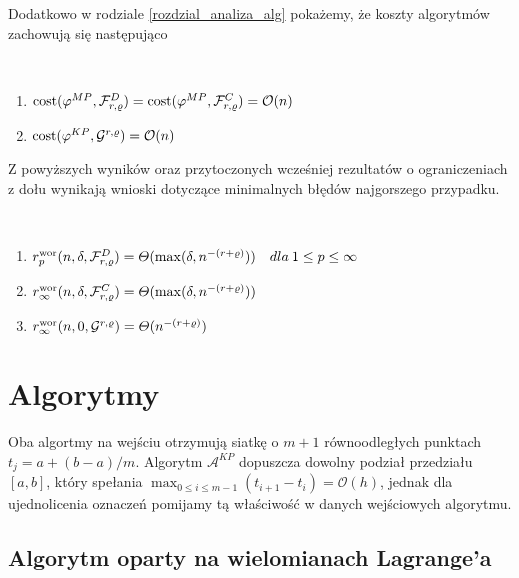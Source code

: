 \documentclass[oik, pdftex, robocza, man]{mgrwms}
\begin{document}
    Dodatkowo w rodziale \ref{rozdzial_analiza_alg} pokażemy, że koszty algorytmów zachowują się następująco

    \begin{stw}~%
        \begin{enumerate}
            \item $\mathrm{cost}(\varphi^{MP}, \mathcal{F}_{r,\varrho}^{D}) = \mathrm{cost}(\varphi^{MP}, \mathcal{F}_{r,\varrho}^{C}) = \mathcal{O}(n)$
            \item $\mathrm{cost}(\varphi^{KP}, \mathcal{G}^{r,\varrho}) = \mathcal{O}(n)$
        \end{enumerate}
    \end{stw}

    Z powyższych wyników oraz przytoczonych wcześniej rezultatów o ograniczeniach z dołu wynikają wnioski dotyczące minimalnych błędów najgorszego przypadku.

    \begin{cor}~
        \begin{enumerate}[label=(\roman*)]
            \item $r^{\mathrm{wor}}_{p}(n, \delta, \mathcal{F}^{D}_{r,\varrho}) = \varTheta(\max(\delta, n^{-(r+\varrho)})) \quad dla \: 1 \leq p \leq \infty$
            \item $r^{\mathrm{wor}}_{\infty}(n, \delta, \mathcal{F}^{C}_{r,\varrho}) = \varTheta(\max(\delta, n^{-(r+\varrho)}))$
            \item $r^{\mathrm{wor}}_{\infty}(n, 0, \mathcal{G}^{r,\varrho}) = \varTheta(n^{-(r+\varrho)})$
        \end{enumerate}
    \end{cor}
    
\mgrclosechapter


\chapter{Algorytmy}

    Oba algortmy na wejściu otrzymują siatkę o $m+1$ równoodległych punktach $t_{j} = a+(b-a) / m$. Algorytm $\mathcal{A}^{KP}$ dopuszcza dowolny podział przedziału $[a,b]$, który spełania $\max_{0\leq i \leq m-1} (t_{i+1}-t_{i}) = \mathcal{O}(h)$, jednak dla ujednolicenia oznaczeń pomijamy tą właściwość w danych wejściowych algorytmu.

\section{Algorytm oparty na wielomianach Lagrange'a}
\end{document}
